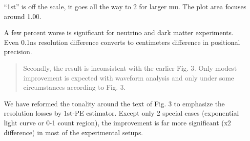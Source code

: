 \documentclass[12pt]{article}
\begin{document}
``1st'' is off the scale, it goes all the way to 2 for larger mu.  The plot area focuses around 1.00.

A few percent worse is significant for neutrino and dark matter experiments.  Even 0.1ns resolution difference converts to centimeters difference in positional precision.

\begin{quote}
Secondly, the result is inconsistent with the earlier Fig. 3. Only modest improvement is expected with waveform analysis and only under some circumstances according to Fig. 3.
\end{quote}

We have reformed the tonality around the text of Fig. 3 to emphasize the resolution losses by 1st-PE estimator.  Except only 2 special cases (exponential light curve or 0-1 count region), the improvement is far more significant (x2 difference) in most of the experimental setups.
\end{document}
